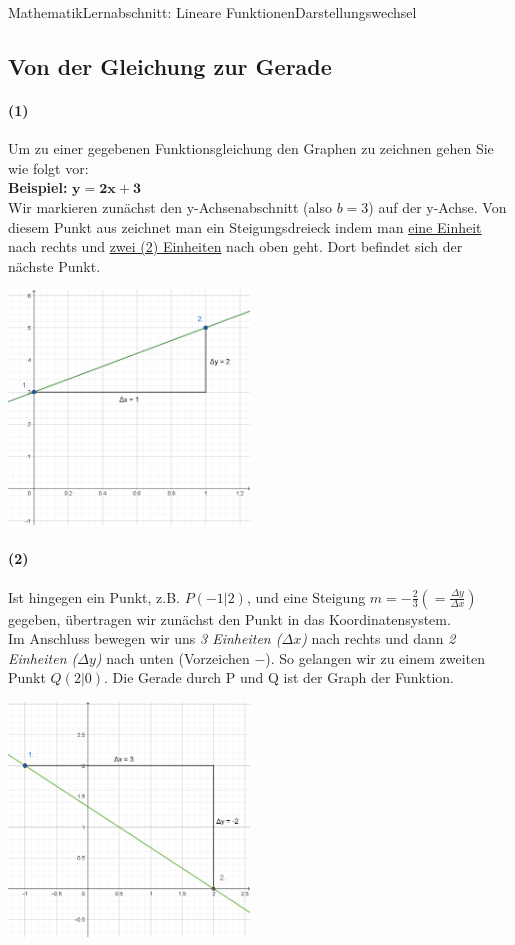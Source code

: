 \documentclass[11pt,twocolumn,oneside,openany,headings=optiontotoc,11pt,numbers=noenddot]{article}
\begin{document}
\begin{worksheet}{Mathematik}{Lernabschnitt: Lineare Funktionen}{Darstellungswechsel}
		\subsection{Von der Gleichung zur Gerade}
		\paragraph{(1)} Um zu einer gegebenen Funktionsgleichung den Graphen zu zeichnen gehen Sie wie folgt vor:\\
		\textbf{Beispiel:} \(\mathbf{y = 2x + 3}\)\\
		Wir markieren zunächst den y-Achsenabschnitt (also \(b = 3\)) auf der y-Achse. Von diesem Punkt aus zeichnet man ein Steigungsdreieck indem man \underline{eine Einheit} nach rechts und \underline{zwei (2) Einheiten} nach oben geht. Dort befindet sich der nächste Punkt.\\
		\par\noindent
		\includegraphics[width=0.48\textwidth]{../99_Bilder/FzG1.png}\\
		\paragraph{(2)} Ist hingegen ein Punkt, z.B. \(P(-1|2)\), und eine Steigung \(m=-\frac{2}{3} (=\frac{\Delta{}y}{\Delta{}x})\) gegeben, übertragen wir zunächst den Punkt in das Koordinatensystem.\\
		Im Anschluss bewegen wir uns \textit{3 Einheiten (\(\Delta{}x\))} nach rechts und dann \textit{2 Einheiten (\(\Delta{}y\))} nach unten (Vorzeichen \(-\)). So gelangen wir zu einem zweiten Punkt \(Q(2|0)\). Die Gerade durch P und Q ist der Graph der Funktion.\\
		\par\noindent
		\includegraphics[width=0.48\textwidth]{../99_Bilder/FzG2.png}

\end{worksheet}
\end{document}
